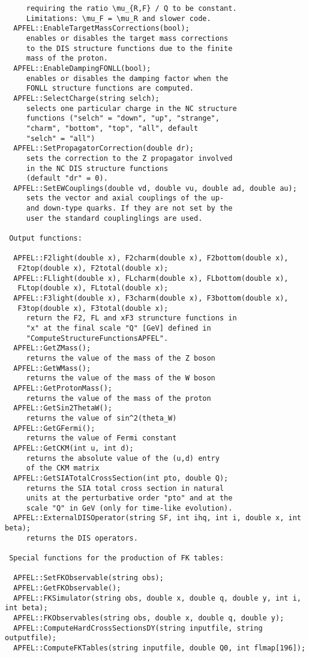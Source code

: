 \documentclass[11pt,a4paper]{article}
\begin{document}
\begin{lstlisting}
     requiring the ratio \mu_{R,F} / Q to be constant.
     Limitations: \mu_F = \mu_R and slower code.
  APFEL::EnableTargetMassCorrections(bool);
     enables or disables the target mass corrections
     to the DIS structure functions due to the finite
     mass of the proton.
  APFEL::EnableDampingFONLL(bool);
     enables or disables the damping factor when the
     FONLL structure functions are computed.
  APFEL::SelectCharge(string selch);
     selects one particular charge in the NC structure
     functions ("selch" = "down", "up", "strange",
     "charm", "bottom", "top", "all", default 
     "selch" = "all")
  APFEL::SetPropagatorCorrection(double dr);
     sets the correction to the Z propagator involved
     in the NC DIS structure functions
     (default "dr" = 0).
  APFEL::SetEWCouplings(double vd, double vu, double ad, double au);
     sets the vector and axial couplings of the up-
     and down-type quarks. If they are not set by the
     user the standard couplinglings are used.
   
 Output functions:
 
  APFEL::F2light(double x), F2charm(double x), F2bottom(double x),
   F2top(double x), F2total(double x);
  APFEL::FLlight(double x), FLcharm(double x), FLbottom(double x),
   FLtop(double x), FLtotal(double x);
  APFEL::F3light(double x), F3charm(double x), F3bottom(double x),
   F3top(double x), F3total(double x);
     return the F2, FL and xF3 struncture functions in
     "x" at the final scale "Q" [GeV] defined in
     "ComputeStructureFunctionsAPFEL".
  APFEL::GetZMass();
     returns the value of the mass of the Z boson
  APFEL::GetWMass();
     returns the value of the mass of the W boson
  APFEL::GetProtonMass();
     returns the value of the mass of the proton
  APFEL::GetSin2ThetaW();
     returns the value of sin^2(theta_W)
  APFEL::GetGFermi();
     returns the value of Fermi constant
  APFEL::GetCKM(int u, int d);
     returns the absolute value of the (u,d) entry
     of the CKM matrix
  APFEL::GetSIATotalCrossSection(int pto, double Q);
     returns the SIA total cross section in natural
     units at the perturbative order "pto" and at the
     scale "Q" in GeV (only for time-like evolution).
  APFEL::ExternalDISOperator(string SF, int ihq, int i, double x, int beta);
     returns the DIS operators.
   
 Special functions for the production of FK tables:
   
  APFEL::SetFKObservable(string obs);
  APFEL::GetFKObservable();
  APFEL::FKSimulator(string obs, double x, double q, double y, int i, int beta);
  APFEL::FKObservables(string obs, double x, double q, double y);
  APFEL::ComputeHardCrossSectionsDY(string inputfile, string outputfile);
  APFEL::ComputeFKTables(string inputfile, double Q0, int flmap[196]);
\end{lstlisting}
\end{document}
